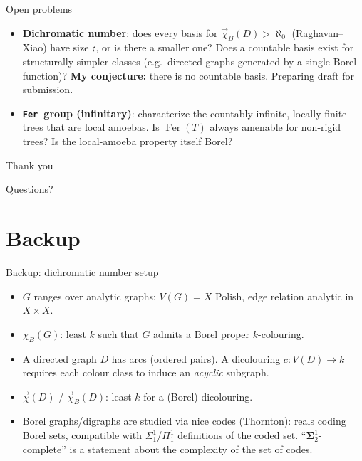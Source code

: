 \documentclass[aspectratio=169]{beamer}
\DeclareMathOperator{\Fer}{Fer}
\newcommand{\tFer}{\texttt{Fer}\ }
\begin{document}
\begin{frame}{Open problems}
  \begin{itemize}
    \item \textbf{Dichromatic number}: does every basis for $\vec\chi_B(D)>\aleph_0$ (Raghavan--Xiao) have size $\mathfrak c$, or is there a smaller one? Does a countable basis exist for structurally simpler classes (e.g.\ directed graphs generated by a single Borel function)?
    \textbf{My conjecture:} there is no countable basis. Preparing draft for submission.
    \item \textbf{\tFer group (infinitary)}: characterize the countably infinite, locally finite trees that are local amoebas. Is $\overline{\Fer(T)}$ always amenable for non-rigid trees? Is the local-amoeba property itself Borel?
  \end{itemize}
\end{frame}

\begin{frame}
  \centering
  {\Large Thank you}

  \vspace{1em}
  \normalsize Questions?
\end{frame}

%
\ifdefined\NoBackupSlides
\else
\appendix
\section{Backup}

\begin{frame}{Backup: dichromatic number setup}
  \begin{itemize}
    \item $G$ ranges over \alert{analytic graphs}: $V(G)=X$ Polish, edge relation analytic in $X\times X$.
    \item $\chi_B(G)$: least $k$ such that $G$ admits a Borel proper $k$-colouring.
    \item A \alert{directed graph} $D$ has arcs (ordered pairs). A \alert{dicolouring} $c\colon V(D)\to k$ requires each colour class to induce an \emph{acyclic} subgraph.
    \item $\vec\chi(D)$ / $\vec\chi_B(D)$: least $k$ for a (Borel) dicolouring.
    \item Borel graphs/digraphs are studied via \alert{nice codes} (Thornton): reals coding Borel sets, compatible with $\Sigma^1_1$/$\Pi^1_1$ definitions of the coded set. ``$\mathbf\Sigma^1_2$-complete'' is a statement about the complexity of the set of codes.
  \end{itemize}
\end{frame}
\end{document}
